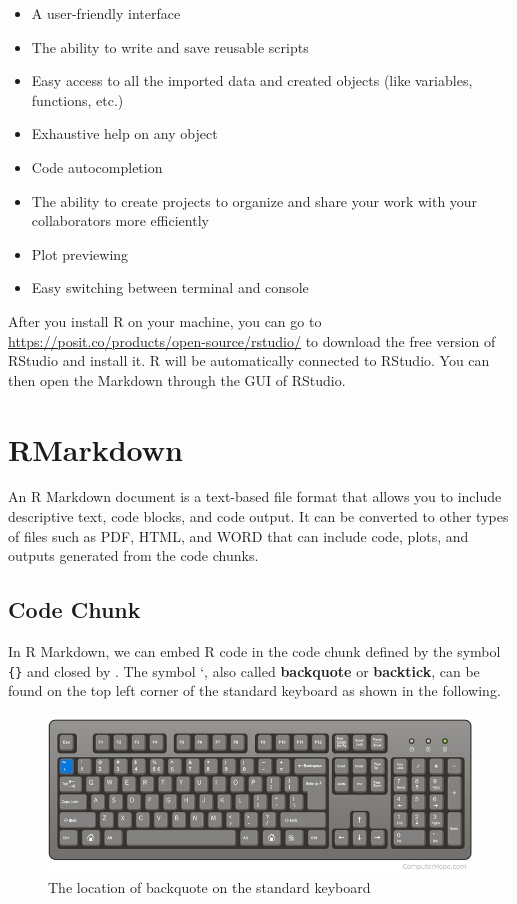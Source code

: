 \documentclass[
]{book}
\providecommand{\tightlist}{%
  \setlength{\itemsep}{0pt}\setlength{\parskip}{0pt}}
\begin{document}
\begin{itemize}
\tightlist
\item
  A user-friendly interface
\item
  The ability to write and save reusable scripts
\item
  Easy access to all the imported data and created objects (like variables, functions, etc.)
\item
  Exhaustive help on any object
\item
  Code autocompletion
\item
  The ability to create projects to organize and share your work with your collaborators more efficiently
\item
  Plot previewing
\item
  Easy switching between terminal and console
\end{itemize}

After you install R on your machine, you can go to \url{https://posit.co/products/open-source/rstudio/} to download the free version of RStudio and install it. R will be automatically connected to RStudio. You can then open the Markdown through the GUI of RStudio.

\hypertarget{rmarkdown}{%
\section{RMarkdown}\label{rmarkdown}}

An R Markdown document is a text-based file format that allows you to include descriptive text, code blocks, and code output. It can be converted to other types of files such as PDF, HTML, and WORD that can include code, plots, and outputs generated from the code chunks.

\hypertarget{code-chunk}{%
\subsection{Code Chunk}\label{code-chunk}}

In R Markdown, we can embed R code in the code chunk defined by the symbol \texttt{\textasciigrave{}\textasciigrave{}\textasciigrave{}\{\}} and closed by \texttt{\textasciigrave{}\textasciigrave{}\textasciigrave{}}. The symbol \texttt{} `, also called \textbf{backquote} or \textbf{backtick}, can be found on the top left corner of the standard keyboard as shown in the following.

\begin{figure}

{\centering \includegraphics[width=0.8\linewidth]{img01/Key4CodeChunk} 

}

\caption{The location of backquote on the standard keyboard}\label{fig:unnamed-chunk-13}
\end{figure}
\end{document}
